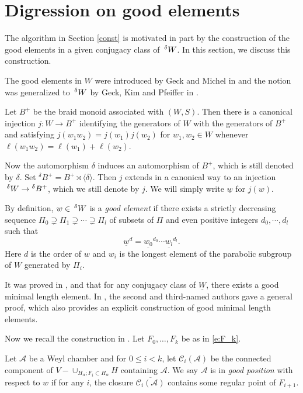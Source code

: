 \documentclass[10pt,leqno]{article}
\newcommand{\caC}{\mathcal C}
\newcommand{\caA}{\mathcal A}
\renewcommand{\a}{\mathfrak a}
\renewcommand{\sec}[1]{\section{#1}
\renewcommand{\theequation}{\thesection.\arabic{equation}}
  \setcounter{equation}{0}}
\newcommand{\Wext}{\negthinspace\negthinspace\phantom{a}^\delta W}
\def\le{\leqslant}
\def\a{\alpha}
\renewcommand{\sec}[1]{\section{#1}
\renewcommand{\theequation}{\thesection.\arabic{equation}}
  \setcounter{equation}{0}}
\begin{document}
\sec{Digression on  good elements}
\label{s:digression}

The algorithm in Section \ref{const} is  motivated in part by
the construction of the good elements in a given conjugacy class of
$\Wext$. In this section, we discuss this
construction.

The good elements in $W$ were introduced by Geck and Michel in
\cite{geck_michel_good} and the notion was generalized to $\Wext$ by Geck, Kim and
Pfeiffer in \cite{gkp}.

Let $B^+$ be the braid monoid associated with $(W,S)$. Then there is a
canonical injection $j:W\longrightarrow B^+$ identifying the
generators of $W$ with the generators of $B^+$ and
satisfying $j(w_1w_2)=j(w_1)j(w_2)$ for $w_1,w_2\in W$ whenever
$\ell(w_1w_2)=\ell(w_1)+\ell(w_2)$.

Now the automorphism $\delta$ induces an automorphism of $B^+$, which
is still denoted by $\delta$. Set ${}^{\delta} B^+=B^+ \rtimes
\langle\delta\rangle$. Then $j$ extends in a canonical way to an
injection $\Wext \to {}^{\delta} B^+$, which we still denote by
$j$. We will simply write $\underline w$ for $j(w)$.

By definition, $w \in \Wext$ is a {\it good element} if there exists a
strictly decreasing sequence $\Pi_0 \supsetneq \Pi_1 \supsetneq \cdots
\supsetneq \Pi_l$ of subsets of $\Pi$ and even positive integers
$d_0,\cdots,d_l$ such
that $${\underline{w}}^d=\underline{w_0}^{d_0}\cdots\underline{w_l}^{d_l}.$$
Here $d$ is the order of $w$ and $w_i$ is the longest element of the
parabolic subgroup of $W$ generated by $\Pi_i$.

It was proved in \cite{geck_michel_good}, \cite{gkp} and \cite{he_minimal_length_double_cosets} that for any
conjugacy class of $\underline W$, there exists a good minimal length
element. In \cite{he_nie_minimal_finite}, the second and third-named authors
gave a general proof, which also provides an explicit construction of good
minimal length elements.

Now we recall the construction in \cite{he_nie_minimal_finite}.
Let $F_0,\dots, F_k$ be as in \eqref{e:F_k}.

Let $\caA$ be a Weyl chamber and for $0 \le i < k$, let $\caC_i(\caA)$
be the connected component of $V-\cup_{H_\a; F_i \subset H_\a}H$
containing $\caA$. We say $\caA$ is in {\it good position} with
respect to $w$ if for any $i$, the closure $\overline{\caC_i(\caA)}$
contains some regular point of $F_{i+1}$.
\end{document}
